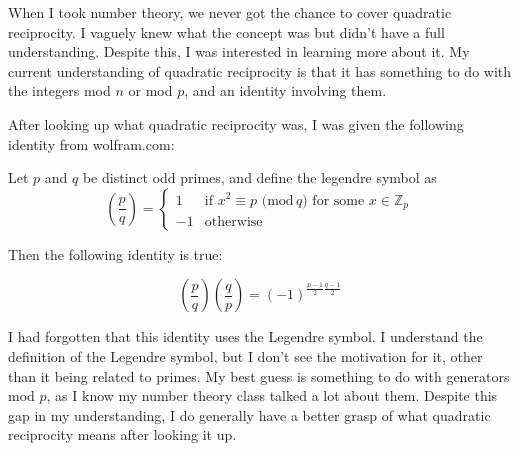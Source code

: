 \documentclass[12pt]{article}
\newcommand{\parns}[1]{\left(#1\right)}
\begin{document}
\pagestyle{fancy}
\fancyhead{}

\normalsize

When I took number theory, we never got the chance to cover quadratic reciprocity. I vaguely knew what the concept was but didn't have a full understanding. Despite this, I was interested in learning more about it. My current understanding of quadratic reciprocity is that it has something to do with the integers mod $n$ or mod $p$, and an identity involving them.

After looking up what quadratic reciprocity was, I was given the following identity from wolfram.com:

Let $p$ and $q$ be distinct odd primes, and define the legendre symbol as
\[\parns{\frac{p}{q}}=\begin{cases}
    1 & \text{if }x^2\equiv p\text{ (mod}\,q)\text{ for some }x\in\mathbb{Z}_p\\
    -1 & \text{otherwise}
\end{cases}\]

Then the following identity is true:

\[\parns{\frac{p}{q}}\parns{\frac{q}{p}}=(-1)^{\frac{p-1}{2}\frac{q-1}{2}}\]

I had forgotten that this identity uses the Legendre symbol. I understand the definition of the Legendre symbol, but I don't see the motivation for it, other than it being related to primes. My best guess is something to do with generators mod $p$, as I know my number theory class talked a lot about them. Despite this gap in my understanding, I do generally have a better grasp of what quadratic reciprocity means after looking it up.
\end{document}

